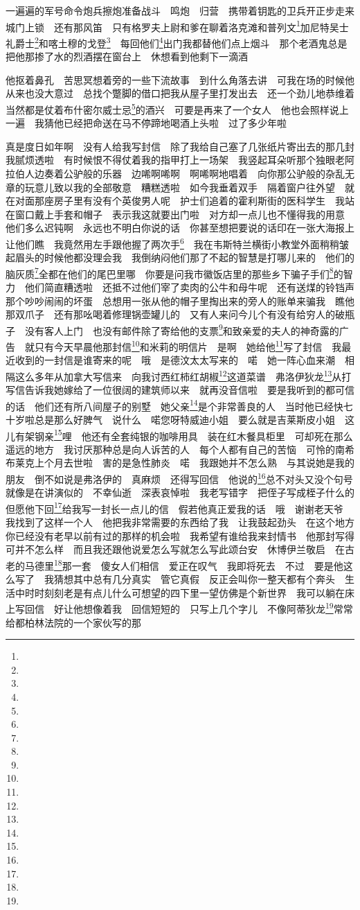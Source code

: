 \par 一遍遍的军号命令炮兵擦炮准备战斗　鸣炮　归营　携带着钥匙的卫兵开正步走来　城门上锁　还有那风笛　只有格罗夫上尉和爹在聊着洛克滩和普列文\footnote{}加尼特吴士礼爵士\footnote{}和喀土穆的戈登\footnote{}　每回他们\footnote{}出门我都替他们点上烟斗　那个老酒鬼总是把他那掺了水的烈酒摆在窗台上　休想看到他剩下一滴酒　
\par 他抠着鼻孔　苦思冥想着旁的一些下流故事　到什么角落去讲　可我在场的时候他从来也没大意过　总找个蹩脚的借口把我从屋子里打发出去　还一个劲儿地恭维着　当然都是仗着布什密尔威士忌\footnote{}的酒兴　可要是再来了一个女人　他也会照样说上一遍　我猜他已经把命送在马不停蹄地喝酒上头啦　过了多少年啦　
\par 真是度日如年啊　没有人给我写封信　除了我给自己塞了几张纸片寄出去的那几封　我腻烦透啦　有时候恨不得仗着我的指甲打上一场架　我竖起耳朵听那个独眼老阿拉伯人边奏着公驴般的乐器　边唏啊唏啊　啊唏啊地唱着　向你那公驴般的杂乱无章的玩意儿致以我的全部敬意　糟糕透啦　如今我垂着双手　隔着窗户往外望　就在对面那座房子里有没有个英俊男人呢　护士们追着的霍利斯街的医科学生　我站在窗口戴上手套和帽子　表示我这就要出门啦　对方却一点儿也不懂得我的用意　他们多么迟钝啊　永远也不明白你说的话　你甚至想把要说的话印在一张大海报上让他们瞧　我竟然用左手跟他握了两次手\footnote{}　我在韦斯特兰横街小教堂外面稍稍皱起眉头的时候他都没理会我　我倒纳闷他们那了不起的智慧是打哪儿来的　他们的脑灰质\footnote{}全都在他们的尾巴里哪　你要是问我市徽饭店里的那些乡下骗子手们\footnote{}的智力　他们简直糟透啦　还抵不过他们宰了卖肉的公牛和母牛呢　还有送煤的铃铛声　那个吵吵闹闹的坏蛋　总想用一张从他的帽子里掏出来的旁人的账单来骗我　瞧他那双爪子　还有那吆喝着修理锅壶罐儿的　又有人来问今儿个有没有给穷人的破瓶子　没有客人上门　也没有邮件除了寄给他的支票\footnote{}和致亲爱的夫人的神奇露的广告　就只有今天早晨他那封信\footnote{}和米莉的明信片　是啊　她给他\footnote{}写了封信　我最近收到的一封信是谁寄来的呢　哦　是德汶太太写来的　喏　她一阵心血来潮　相隔这么多年从加拿大写信来　向我讨西红柿红胡椒\footnote{}这道菜谱　弗洛伊狄龙\footnote{}从打写信告诉我她嫁给了一位很阔的建筑师以来　就再没音信啦　要是我听到的都可信的话　他们还有所八间屋子的别墅　她父亲\footnote{}是个非常善良的人　当时他已经快七十岁啦总是那么好脾气　说什么　喏您呀特威迪小姐　要么就是吉莱斯皮小姐　这儿有架钢亲\footnote{}哩　他还有全套纯银的咖啡用具　装在红木餐具柜里　可却死在那么遥远的地方　我讨厌那种总是向人诉苦的人　每个人都有自己的苦恼　可怜的南希布莱克上个月去世啦　害的是急性肺炎　喏　我跟她并不怎么熟　与其说她是我的朋友　倒不如说是弗洛伊的　真麻烦　还得写回信　他说的\footnote{}总不对头又没个句号　就像是在讲演似的　不幸仙逝　深表哀悼啦　我老写错字　把侄子写成桎子什么的　但愿他下回\footnote{}给我写一封长一点儿的信　假若他真正爱我的话　哦　谢谢老天爷　我找到了这样一个人　他把我非常需要的东西给了我　让我鼓起劲头　在这个地方你已经没有老早以前有过的那样的机会啦　我希望有谁给我来封情书　他那封写得可并不怎么样　而且我还跟他说爱怎么写就怎么写此颂台安　休博伊兰敬启　在古老的马德里\footnote{}那一套　傻女人们相信　爱正在叹气　我即将死去　不过　要是他这么写了　我猜想其中总有几分真实　管它真假　反正会叫你一整天都有个奔头　生活中时时刻刻老是有点儿什么可想望的四下里一望仿佛是个新世界　我可以躺在床上写回信　好让他想像着我　回信短短的　只写上几个字儿　不像阿蒂狄龙\footnote{}常常给都柏林法院的一个家伙写的那